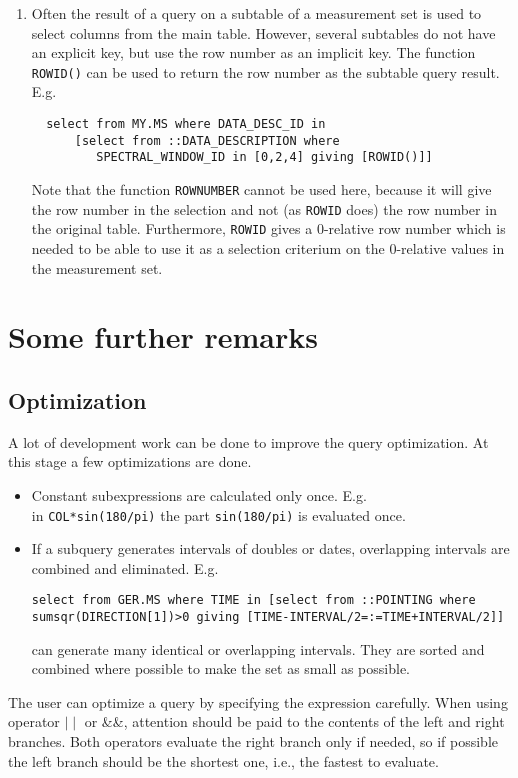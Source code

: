 \begin{enumerate}
\item
Often the result of a query on a subtable of a measurement set is
used to select columns from the main table. However, several
subtables do not have an explicit key, but use the row number as
an implicit key. The function \texttt{ROWID()} can be used to
return the row number as the subtable query result. E.g.
\begin{verbatim}
  select from MY.MS where DATA_DESC_ID in
      [select from ::DATA_DESCRIPTION where
         SPECTRAL_WINDOW_ID in [0,2,4] giving [ROWID()]] 
\end{verbatim}
Note that the function \texttt{ROWNUMBER} cannot be used here,
because it will give the row number in the selection and not
(as \texttt{ROWID} does) the row number in the original table.
Furthermore, \texttt{ROWID} gives a 0-relative row number which is
needed to be able to use it as a selection criterium on the 0-relative
values in the measurement set.
\end{enumerate}


\section{Some further remarks}
\subsection{Optimization}
A lot of development work can be done to improve the query optimization.
At this stage a few optimizations are done.
\begin{itemize}
\item Constant subexpressions are calculated only once. E.g.
\\in \texttt{COL*sin(180/pi)} the part \texttt{sin(180/pi)} is
evaluated once.
\item If a subquery generates intervals of doubles or dates, overlapping
intervals are combined and eliminated. E.g.
\begin{verbatim}
select from GER.MS where TIME in [select from ::POINTING where
sumsqr(DIRECTION[1])>0 giving [TIME-INTERVAL/2=:=TIME+INTERVAL/2]]
\end{verbatim}
can generate many identical or overlapping intervals. They are
sorted and combined where possible to make the set as small as possible.
\end{itemize}

The user can optimize a query by specifying the expression
carefully. When using operator $\mid\mid$ or \&\&,
attention should be
paid to the contents of the left and right branches. Both operators
evaluate the right branch only if needed, so if possible the left branch
should be the shortest one, i.e., the fastest to evaluate.

